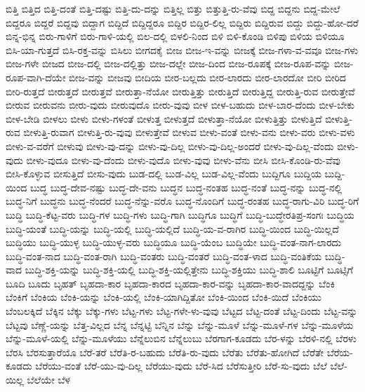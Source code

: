 {ಬಿತ್ತಿ
ಬಿತ್ತಿದ
ಬಿತ್ತಿ-ದಂತೆ
ಬಿತ್ತಿ-ದಷ್ಟು
ಬಿತ್ತಿ-ದು-ದನ್ನು
ಬಿತ್ತಿಲ್ಲ
ಬಿತ್ತು
ಬಿತ್ತುತ್ತಿ-ರು-ವೆವು
ಬಿದ್ದ
ಬಿದ್ದನು
ಬಿದ್ದ-ಮೇಲೆ
ಬಿದ್ದರೂ
ಬಿದ್ದರೆ
ಬಿದ್ದವು
ಬಿದ್ದಾಗ
ಬಿದ್ದಿದೆ
ಬಿದ್ದಿದ್ದರೂ
ಬಿದ್ದಿರ
ಬಿದ್ದಿರ-ಲಿಲ್ಲ
ಬಿದ್ದಿರು
ಬಿದ್ದಿರುವ
ಬಿದ್ದು
ಬಿದ್ದು-ಹೋ-ದರೆ
ಬಿನ್ನ-ಭಿನ್ನ
ಬಿರು-ಗಾಳಿಗೆ
ಬಿರು-ಗಾಳಿ-ಯಲ್ಲಿ
ಬಿಲ-ದಲ್ಲಿ
ಬಿಳಲಿ-ನಿಂದ
ಬಿಳಿ
ಬಿಳಿ-ಕೊಂಡಿ
ಬಿಳಿಪು
ಬಿಳಿಯ
ಬಿಳಿಯೂ
ಬಿಸಿ-ಯಾ-ಗುತ್ತದೆ
ಬಿಸಿ-ರಕ್ತ-ವನ್ನು
ಬಿಸಿಲು
ಬೀಗದಕೈ
ಬೀಜ
ಬೀಜ-ಇ-ವನ್ನು
ಬೀಜಕ್ಕೆ
ಬೀಜ-ಗಳಾ-ವ-ವವೂ
ಬೀಜ-ಗಳು
ಬೀಜ-ಗಳೇ
ಬೀಜದ
ಬೀಜ-ದಲ್ಲಿ
ಬೀಜ-ದಲ್ಲಿತ್ತು
ಬೀಜ-ದಲ್ಲೇ
ಬೀಜ-ದಿಂದ
ಬೀಜ-ರೂಪಕ್ಕೆ
ಬೀಜ-ರೂಪ-ವನ್ನು
ಬೀಜ-ರೂಪ-ವಾಗಿ-ದೆಯೇ
ಬೀಜ-ವನ್ನು
ಬೀಜವು
ಬೀದಿಯ
ಬೀರ-ಬಲ್ಲದು
ಬೀರ-ಲಾರದು
ಬೀರ-ಲಾರದೋ
ಬೀರಿ
ಬೀರಿದ
ಬೀರಿ-ರುತ್ತದೆ
ಬೀರುತ್ತದೆ
ಬೀರುತ್ತವೆ
ಬೀರುತ್ತಾ-ನೆಯೋ
ಬೀರುತ್ತಿತ್ತು
ಬೀರುತ್ತಿದೆ
ಬೀರುತ್ತಿದ್ದ
ಬೀರುತ್ತಿ-ರುವ
ಬೀರುತ್ತೇವೆ
ಬೀರುವ
ಬೀರುವನು
ಬೀರು-ವುದು
ಬೀರುವುದೊ
ಬೀರು-ವುವು
ಬೀಳ
ಬೀಳ-ಬಹುದು
ಬೀಳ-ಬಾರ-ದೆಂದು
ಬೀಳ-ಬೇಕು
ಬೀಳ-ಬೇಡಿ
ಬೀಳಲು
ಬೀಳು
ಬೀಳು-ಗಳಂತೆ
ಬೀಳುತ್ತ
ಬೀಳುತ್ತದೆ
ಬೀಳುತ್ತಾ-ನೆಯೋ
ಬೀಳುತ್ತಿತ್ತು
ಬೀಳುತ್ತಿದೆ
ಬೀಳುತ್ತಿ-ರುವ
ಬೀಳುತ್ತಿ-ರುವಾಗ
ಬೀಳುತ್ತಿ-ರು-ವುವು
ಬೀಳುತ್ತೇವೆ
ಬೀಳುವ
ಬೀಳು-ವಂತೆ
ಬೀಳು-ವನು
ಬೀಳು-ವರು
ಬೀಳು-ವಳು
ಬೀಳು-ವ-ವರೆಗೆ
ಬೀಳುವು
ಬೀಳು-ವು-ದನ್ನು
ಬೀಳು-ವು-ದಿಲ್ಲ
ಬೀಳು-ವು-ದಿಲ್ಲ-ಅಂದರೆ
ಬೀಳು-ವು-ದಿಲ್ಲ-ವೆಂದು
ಬೀಳು-ವುದು
ಬೀಳು-ವುದೂ
ಬೀಳು-ವು-ದೆಂದು
ಬೀಳು-ವುದೊ
ಬೀಳು-ವುವು
ಬೀಳು-ವೆನು
ಬೀಸಿ
ಬೀಸಿ-ಕೊಂಡಿ-ರು-ವೆವು
ಬೀಸಿ-ಕೊಳ್ಳುವ
ಬೀಸುತ್ತಿದೆ
ಬೀಸು-ವುದು
ಬುಡ-ದಲ್ಲಿ
ಬುಡ-ವಿಲ್ಲ
ಬುಡ-ವಿಲ್ಲ-ವೆಂದು
ಬುದ್ದಿಗೂ
ಬುದ್ದಿಯ
ಬುದ್ದಿ-ಯಿಂದ
ಬುದ್ಧ
ಬುದ್ಧ-ದೇವ-ನಷ್ಟು
ಬುದ್ಧ-ದೇ-ವನು
ಬುದ್ಧನ
ಬುದ್ಧ-ನಂತಹ
ಬುದ್ಧ-ನಂತೆ
ಬುದ್ಧ-ನನ್ನು
ಬುದ್ಧ-ನಲ್ಲಿ
ಬುದ್ಧ-ನಿಗೆ
ಬುದ್ಧನು
ಬುದ್ಧ-ನೆಂದರೆ
ಬುದ್ಧ-ನೆನ್ನು-ವರೊ
ಬುದ್ಧ-ನೊಂದಿಗೆ
ಬುದ್ಧ-ರಂತಹ
ಬುದ್ಧ-ರಾಗು-ವಿರಿ
ಬುದ್ಧ-ರಿಗೆ
ಬುದ್ಧಿ
ಬುದ್ಧಿ-ಕೆಟ್ಟ-ವರು
ಬುದ್ಧಿ-ಗಳ
ಬುದ್ಧಿ-ಗಳು
ಬುದ್ಧಿ-ಗಾಗಿ
ಬುದ್ಧಿಗೂ
ಬುದ್ಧಿಗೆ
ಬುದ್ಧಿ-ಬುದ್ಧೇರತಿಪ್ರ-ಸಂಗಃ
ಬುದ್ಧಿಯ
ಬುದ್ಧಿ-ಯಂತೆ
ಬುದ್ಧಿ-ಯನ್ನು
ಬುದ್ಧಿ-ಯಲ್ಲಿ
ಬುದ್ಧಿ-ಯಲ್ಲಿದೆ
ಬುದ್ಧಿ-ಯ-ವ-ರಾಗಿರ
ಬುದ್ಧಿ-ಯಿಂದ
ಬುದ್ಧಿ-ಯಿಲ್ಲದೆ
ಬುದ್ಧಿಯು
ಬುದ್ಧಿ-ಯುಳ್ಳ
ಬುದ್ಧಿ-ಯುಳ್ಳ-ವರು
ಬುದ್ಧಿಯೂ
ಬುದ್ಧಿ-ಯೆಂಬ
ಬುದ್ಧಿಯೇ
ಬುದ್ಧಿ-ವಂತ-ನಾಗ-ಲಾರದು
ಬುದ್ಧಿ-ವಂತ-ನಾದ
ಬುದ್ಧಿ-ವಂತ-ರಾಗಿ
ಬುದ್ಧಿ-ವಂತರು
ಬುದ್ಧಿ-ವಂತರೆ
ಬುದ್ಧಿ-ವಂತ-ಳಾದ
ಬುದ್ಧಿ-ವಂತಿಕೆಯ
ಬುದ್ಧಿ-ವಾದ
ಬುದ್ಧಿ-ಶಕ್ತಿ-ಯನ್ನು
ಬುದ್ಧಿ-ಶಕ್ತಿ-ಯಲ್ಲಿ
ಬುದ್ಧಿ-ಶಕ್ತಿ-ಯಲ್ಲಿತ್ತೇನು
ಬುದ್ಧಿ-ಶಕ್ತಿಯು
ಬುದ್ಧಿ-ಶಾಲಿ
ಬೂಟ್ಟಿಗೆ
ಬೂಟ್ಸಿಗೆ
ಬೂದಿ
ಬೂದು
ಬೃಹತ್
ಬೃಹದಾ-ಕಾರ
ಬೃಹದಾ-ಕಾರದ
ಬೃಹದಾ-ಕಾರ-ವನ್ನು
ಬೃಹದಾ-ಕಾರ-ವಾದದ್ದನ್ನು
ಬೆಂಕಿ
ಬೆಂಕಿಗೆ
ಬೆಂಕಿಯ
ಬೆಂಕಿ-ಯನ್ನು
ಬೆಂಕಿ-ಯಲ್ಲಿ
ಬೆಂಕಿ-ಯಾಗಿದ್ದಿತೋ
ಬೆಂಕಿ-ಯಿಂದ
ಬೆಂಕಿ-ಯಿದೆ
ಬೆಂಕಿಯು
ಬೆಂಬಲಕ್ಕಿದೆ
ಬೆಕ್ಕಿನ
ಬೆಕ್ಕು
ಬೆಕ್ಕು-ಗಳು
ಬೆಟ್ಟ-ಗಳು
ಬೆಟ್ಟ-ಗಳೇ-ಳು-ವುವು
ಬೆಟ್ಟದ
ಬೆಟ್ಟ-ದಂತೆ
ಬೆಟ್ಟ-ದಿಂದು
ಬೆಟ್ಟ-ವನ್ನು
ಬೆಟ್ಟವು
ಬೆಣ್ಣೆ-ಯನ್ನು
ಬೆತ್ತ-ವಿಲ್ಲದ
ಬೆನ್ನ
ಬೆನ್ನಟ್ಟಿ
ಬೆನ್ನಿನ
ಬೆನ್ನು
ಬೆನ್ನು-ಮೂಳೆ
ಬೆನ್ನು-ಮೂಳೆ-ಗಳ
ಬೆನ್ನು-ಮೂಳೆಯ
ಬೆನ್ನು-ಮೂಳೆ-ಯಲ್ಲಿ
ಬೆನ್ನು-ಮೂಳೆಯು
ಬೆನ್ನೆಲುಬಿನ
ಬೆನ್ನೆಲುಬು
ಬೆರಗಾಗ-ಕೂಡದು
ಬೆರ-ಳನ್ನು
ಬೆರಳಿ-ನಲ್ಲಿ
ಬೆರಳು
ಬೆರಸಿ
ಬೆರಸುತ್ತಾರೆಯೊ
ಬೆರೆ-ತರೆ
ಬೆರೆತಿ-ರ-ಬಹುದು
ಬೆರೆತಿ-ರು-ವುದು
ಬೆರೆತು
ಬೆರೆತು-ಹೋಗಿದೆ
ಬೆರೆತೇ
ಬೆರೆಯ-ಕೂಡದು
ಬೆರೆಯು-ವಂತೆ
ಬೆರೆ-ಯು-ವು-ದಿಲ್ಲ
ಬೆರೆಯು-ವುದು
ಬೆರೆ-ಸಿದ
ಬೆರೆಸುತ್ತೀರಿ
ಬೆರೆ-ಸು-ವುದು
ಬೆಲೆ
ಬೆಲೆ-ಯಿಲ್ಲ
ಬೆಲೆಯೇ
ಬೆಳ
}
